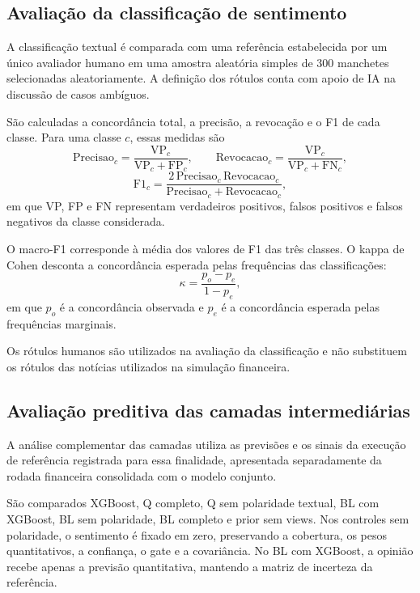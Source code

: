 \subsection{Avaliação da classificação de sentimento}

A classificação textual é comparada com uma
referência estabelecida por um único avaliador
humano em uma amostra aleatória simples de
300 manchetes selecionadas aleatoriamente.
A definição dos rótulos conta com apoio de IA
na discussão de casos ambíguos.

São calculadas a concordância total, a precisão,
a revocação e o F1 de cada classe. Para uma
classe $c$, essas medidas são
\begin{equation}
\mathrm{Precisao}_c
=
\frac{\mathrm{VP}_c}
{\mathrm{VP}_c+\mathrm{FP}_c},
\qquad
\mathrm{Revocacao}_c
=
\frac{\mathrm{VP}_c}
{\mathrm{VP}_c+\mathrm{FN}_c},
\label{eq:precisao_revocacao}
\end{equation}
\begin{equation}
\mathrm{F1}_c
=
\frac{
2\,\mathrm{Precisao}_c\,\mathrm{Revocacao}_c
}{
\mathrm{Precisao}_c+\mathrm{Revocacao}_c
},
\label{eq:f1_sentimento}
\end{equation}
em que VP, FP e FN representam verdadeiros
positivos, falsos positivos e falsos negativos
da classe considerada.

O macro-F1 corresponde à média dos valores de F1
das três classes. O kappa de Cohen desconta
a concordância esperada pelas frequências
das classificações:
\begin{equation}
\kappa
=
\frac{p_o-p_e}{1-p_e},
\label{eq:kappa_sentimento}
\end{equation}
em que $p_o$ é a concordância observada e $p_e$
é a concordância esperada pelas frequências
marginais.

Os rótulos humanos são utilizados na avaliação
da classificação e não substituem os rótulos
das notícias utilizados na simulação financeira.

\subsection{Avaliação preditiva das camadas intermediárias}

A análise complementar das camadas utiliza
as previsões e os sinais da execução de referência
registrada para essa finalidade, apresentada
separadamente da rodada financeira consolidada
com o modelo conjunto.

São comparados XGBoost, Q completo, Q sem polaridade
textual, BL com XGBoost, BL sem polaridade,
BL completo e prior sem views. Nos controles
sem polaridade, o sentimento é fixado em zero,
preservando a cobertura, os pesos quantitativos,
a confiança, o gate e a covariância. No BL com
XGBoost, a opinião recebe apenas a previsão
quantitativa, mantendo a matriz de incerteza
da referência.

